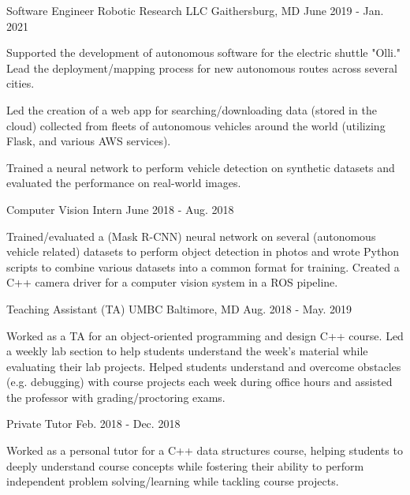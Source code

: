 \begin{cventries}
  \cventry
    {Software Engineer} %
    {Robotic Research LLC} %
    {Gaithersburg, MD} %
    {June 2019 - Jan. 2021} %
    {
      \begin{cvitems} %
        \item {Supported the development of autonomous software for the electric 
          shuttle "Olli."  Lead the deployment/mapping process for new autonomous routes across several cities.}
        \item {Led the creation of a web app for searching/downloading data (stored in the cloud) collected from fleets of autonomous vehicles around the world (utilizing Flask, and various AWS services).}
        \item {Trained a neural network to perform vehicle detection on synthetic datasets and evaluated the performance on real-world images.}
      \end{cvitems}
    }

  \cventry
    {Computer Vision Intern} %
    {} %
    {} %
    {June 2018 - Aug. 2018} %
    {
      \begin{cvitems} %
        \item {Trained/evaluated a (Mask R-CNN) neural network on several (autonomous vehicle related) datasets to perform object detection in photos and wrote Python scripts to combine various datasets into a common format for training.  Created a C++ camera driver for a computer vision system in a ROS pipeline.}
      \end{cvitems}
    }


  \cventry
    {Teaching Assistant (TA)} %
    {UMBC} %
    {Baltimore, MD} %
    {Aug. 2018 - May. 2019} %
    {
      \begin{cvitems} %
        \item{Worked as a TA for an object-oriented programming and design C++ course.  Led a weekly lab section to help students understand the week's material while evaluating their lab projects.  Helped students understand and overcome obstacles (e.g. debugging) with course projects each week during office hours and assisted the professor with grading/proctoring exams.}
      \end{cvitems}
    }

  \cventry
    {Private Tutor} %
    {} %
    {} %
    {Feb. 2018 - Dec. 2018} %
    {
      \begin{cvitems} %
        \item{Worked as a personal tutor for a C++ data structures course, helping students to deeply understand course concepts while fostering their ability to perform independent problem solving/learning while tackling course projects.}
      \end{cvitems}
    }


\end{cventries}

